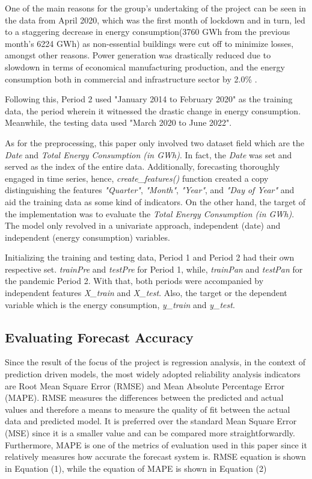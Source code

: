 \documentclass[runningheads]{llncs}
\begin{document}
One of the main reasons for the group’s undertaking of the project can be seen in the data from April 2020, which was the first month of lockdown and in turn, led to a staggering decrease in energy consumption(3760 GWh from the previous month’s 6224 GWh) as non-essential buildings were cut off to minimize losses, amongst other reasons. Power generation was drastically reduced due to slowdown in terms of economical manufacturing production, and the energy consumption both in commercial and infrastructure sector by 2.0\% \cite{shin-woo}.

Following this, Period 2 used "January 2014 to February 2020" as the training data, the period wherein it witnessed the drastic change in energy consumption. Meanwhile, the testing data used "March 2020 to June 2022".

As for the preprocessing, this paper only involved two dataset field which are the \textit{Date} and \textit{Total Energy Consumption (in GWh)}. In fact, the \textit{Date} was set and served as the index of the entire data. Additionally, forecasting thoroughly engaged in time series, hence, \textit{create\_features()} function created a copy distinguishing the features \textit{"Quarter"}, \textit{"Month"}, \textit{"Year"}, and \textit{"Day of Year"} and aid the training data as some kind of indicators. On the other hand, the target of the implementation was to evaluate the \textit{Total Energy Consumption (in GWh)}. The model only revolved in a univariate approach, independent (date) and independent (energy consumption) variables.

Initializing the training and testing data, Period 1 and Period 2 had their own respective set. \textit{trainPre} and \textit{testPre} for Period 1, while, \textit{trainPan} and \textit{testPan} for the pandemic Period 2. With that, both periods were accompanied by independent features \textit{X\_train} and \textit{X\_test}. Also, the target or the dependent variable which is the energy consumption, \textit{y\_train} and \textit{y\_test}.

\subsection{Evaluating Forecast Accuracy}
Since the result of the focus of the project is regression analysis, in the context of prediction driven models, the most widely adopted reliability analysis indicators are Root Mean Square Error (RMSE) and Mean Absolute Percentage Error (MAPE). RMSE measures the differences between the predicted and actual values and therefore a means to measure the quality of fit between the actual data and predicted model. It is preferred over the standard Mean Square Error (MSE) since it is a smaller value and can be compared more straightforwardly. Furthermore, MAPE is one of the metrics of evaluation used in this paper since it relatively measures how accurate the forecast system is. RMSE equation is shown in Equation (1), while the equation of MAPE is shown in Equation (2) \\
\end{document}
